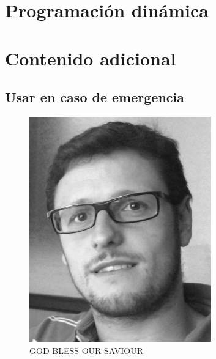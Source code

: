 \documentclass[oneside]{book}
\begin{document}
	\chapter{Programaci\'on din\'amica}
	\chapter{Contenido adicional}
	\section{Usar en caso de emergencia}
	\begin{figure}[h]
		\centering
		\includegraphics[width=0.7\textwidth]{foto}
		\caption*{GOD BLESS OUR SAVIOUR}
	\end{figure}
	\backmatter
	\printindex
\end{document}
